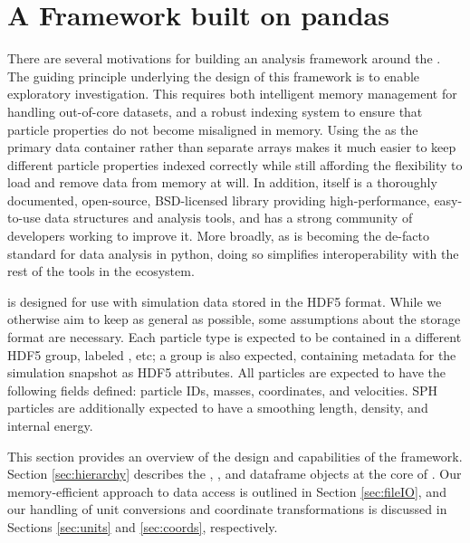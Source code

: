\section{A Framework built on pandas}
\label{sec:framework}

There are several motivations for building an analysis framework around the . 
The guiding principle underlying the design of this framework is to enable exploratory investigation.
This requires both intelligent memory management for handling out-of-core datasets, and a robust indexing system to ensure that particle properties do not become misaligned in memory.
Using  the  as the primary data container rather than separate  arrays makes it much easier to keep different particle properties indexed correctly while still affording the flexibility to load and remove data from memory at will.
In addition,  itself is a thoroughly documented, open-source, BSD-licensed library providing high-performance, easy-to-use data structures and analysis tools, and has a strong community of developers working to improve it.  
More broadly, as  is becoming the de-facto standard for data analysis in python, doing so simplifies interoperability with the rest of the tools in the ecosystem.

 is designed for use with simulation data stored in the HDF5 format.  
While we otherwise aim to keep  as general as possible, some assumptions about the storage format are necessary.
Each particle type is expected to be contained in a different HDF5 group, labeled , etc; a  group is also expected, containing metadata for the simulation snapshot as HDF5 attributes. 
All particles are expected to have the following fields defined: particle IDs, masses, coordinates, and velocities.  
SPH particles are additionally expected to have a smoothing length, density, and internal energy.  

This section provides an overview of the design and capabilities of the  framework.  
Section \ref{sec:hierarchy} describes the , , and  dataframe objects at the core of .  
Our memory-efficient approach to data access is outlined in Section \ref{sec:fileIO}, and our handling of unit conversions and coordinate transformations is discussed in Sections \ref{sec:units} and \ref{sec:coords}, respectively.
